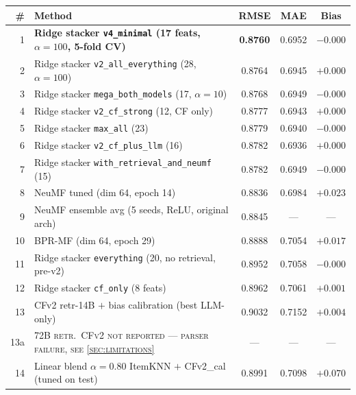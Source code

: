 \documentclass[11pt,a4paper]{article}
\newcommand{\best}[1]{\textcolor{goodgreen}{\textbf{#1}}}
\begin{document}
\begin{table}[H]
\centering
\small
\begin{tabular}{rlccc}
\toprule
\# & Method & RMSE & MAE & Bias \\ \midrule
1  & \best{Ridge stacker \texttt{v4\_minimal} (17 feats, $\alpha{=}100$, 5-fold CV)} & \best{0.8760} & 0.6952 & $-0.000$ \\
2  & Ridge stacker \texttt{v2\_all\_everything} (28, $\alpha{=}100$)                & 0.8764        & 0.6945 & $+0.000$ \\
3  & Ridge stacker \texttt{mega\_both\_models} (17, $\alpha{=}10$)                  & 0.8768        & 0.6949 & $-0.000$ \\
4  & Ridge stacker \texttt{v2\_cf\_strong} (12, CF only)                            & 0.8777        & 0.6943 & $+0.000$ \\
5  & Ridge stacker \texttt{max\_all} (23)                                           & 0.8779        & 0.6940 & $-0.000$ \\
6  & Ridge stacker \texttt{v2\_cf\_plus\_llm} (16)                                  & 0.8782        & 0.6936 & $+0.000$ \\
7  & Ridge stacker \texttt{with\_retrieval\_and\_neumf} (15)                        & 0.8782        & 0.6949 & $-0.000$ \\
8  & NeuMF tuned (dim 64, epoch 14)                                                  & 0.8836        & 0.6984 & $+0.023$ \\
9  & NeuMF ensemble avg (5 seeds, ReLU, original arch)                               & 0.8845        & ---    & ---     \\
10 & BPR-MF (dim 64, epoch 29)                                                       & 0.8888        & 0.7054 & $+0.017$ \\
11 & Ridge stacker \texttt{everything} (20, no retrieval, pre-v2)                   & 0.8952        & 0.7058 & $-0.000$ \\
12 & Ridge stacker \texttt{cf\_only} (8 feats)                                       & 0.8962        & 0.7061 & $+0.001$ \\
13 & CFv2 retr-14B $+$ bias calibration (best LLM-only)                              & 0.9032        & 0.7152 & $+0.004$ \\
13a & \textsc{72B retr.\ CFv2 not reported — parser failure, see \cref{sec:limitations}} & — & — & — \\
14 & Linear blend $\alpha{=}0.80$ ItemKNN $+$ CFv2\_cal (tuned on test)              & 0.8991        & 0.7098 & $+0.070$ \\

\end{tabular}
\end{table}
\end{document}

